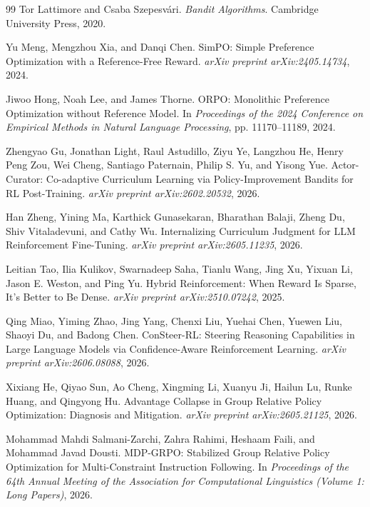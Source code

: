 \documentclass{article}
\begin{document}
\begin{thebibliography}{99}
Tor Lattimore and Csaba Szepesv\'ari.
\newblock \emph{Bandit Algorithms}.
\newblock Cambridge University Press, 2020.

Yu Meng, Mengzhou Xia, and Danqi Chen.
\newblock SimPO: Simple Preference Optimization with a Reference-Free Reward.
\newblock \emph{arXiv preprint arXiv:2405.14734}, 2024.

Jiwoo Hong, Noah Lee, and James Thorne.
\newblock ORPO: Monolithic Preference Optimization without Reference Model.
\newblock In \emph{Proceedings of the 2024 Conference on Empirical Methods in Natural Language Processing}, pp. 11170--11189, 2024.

Zhengyao Gu, Jonathan Light, Raul Astudillo, Ziyu Ye, Langzhou He, Henry Peng Zou, Wei Cheng, Santiago Paternain, Philip S. Yu, and Yisong Yue.
\newblock Actor-Curator: Co-adaptive Curriculum Learning via Policy-Improvement Bandits for RL Post-Training.
\newblock \emph{arXiv preprint arXiv:2602.20532}, 2026.

Han Zheng, Yining Ma, Karthick Gunasekaran, Bharathan Balaji, Zheng Du, Shiv Vitaladevuni, and Cathy Wu.
\newblock Internalizing Curriculum Judgment for LLM Reinforcement Fine-Tuning.
\newblock \emph{arXiv preprint arXiv:2605.11235}, 2026.

Leitian Tao, Ilia Kulikov, Swarnadeep Saha, Tianlu Wang, Jing Xu, Yixuan Li, Jason E. Weston, and Ping Yu.
\newblock Hybrid Reinforcement: When Reward Is Sparse, It's Better to Be Dense.
\newblock \emph{arXiv preprint arXiv:2510.07242}, 2025.

Qing Miao, Yiming Zhao, Jing Yang, Chenxi Liu, Yuehai Chen, Yuewen Liu, Shaoyi Du, and Badong Chen.
\newblock ConSteer-RL: Steering Reasoning Capabilities in Large Language Models via Confidence-Aware Reinforcement Learning.
\newblock \emph{arXiv preprint arXiv:2606.08088}, 2026.

Xixiang He, Qiyao Sun, Ao Cheng, Xingming Li, Xuanyu Ji, Hailun Lu, Runke Huang, and Qingyong Hu.
\newblock Advantage Collapse in Group Relative Policy Optimization: Diagnosis and Mitigation.
\newblock \emph{arXiv preprint arXiv:2605.21125}, 2026.

Mohammad Mahdi Salmani-Zarchi, Zahra Rahimi, Heshaam Faili, and Mohammad Javad Dousti.
\newblock MDP-GRPO: Stabilized Group Relative Policy Optimization for Multi-Constraint Instruction Following.
\newblock In \emph{Proceedings of the 64th Annual Meeting of the Association for Computational Linguistics (Volume 1: Long Papers)}, 2026.


\end{thebibliography}
\end{document}

